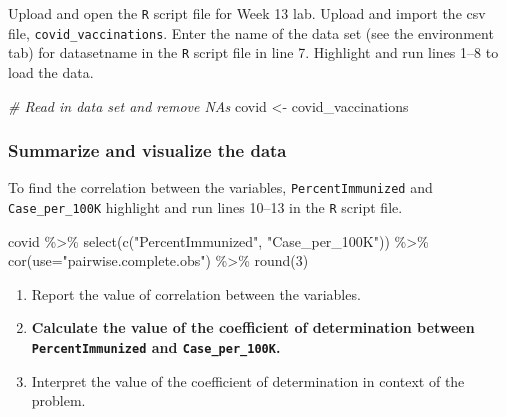 \documentclass[
]{report}
\newenvironment{Shaded}{\begin{snugshade}}{\end{snugshade}}
\newcommand{\AttributeTok}[1]{\textcolor[rgb]{0.77,0.63,0.00}{#1}}
\newcommand{\CommentTok}[1]{\textcolor[rgb]{0.56,0.35,0.01}{\textit{#1}}}
\newcommand{\DecValTok}[1]{\textcolor[rgb]{0.00,0.00,0.81}{#1}}
\newcommand{\FunctionTok}[1]{\textcolor[rgb]{0.00,0.00,0.00}{#1}}
\newcommand{\NormalTok}[1]{#1}
\newcommand{\OtherTok}[1]{\textcolor[rgb]{0.56,0.35,0.01}{#1}}
\newcommand{\SpecialCharTok}[1]{\textcolor[rgb]{0.00,0.00,0.00}{#1}}
\newcommand{\StringTok}[1]{\textcolor[rgb]{0.31,0.60,0.02}{#1}}
\begin{document}
Upload and open the \texttt{R} script file for Week 13 lab. Upload and import the csv file, \texttt{covid\_vaccinations}. Enter the name of the data set (see the environment tab) for datasetname in the \texttt{R} script file in line 7. Highlight and run lines 1--8 to load the data.

\begin{Shaded}
\begin{Highlighting}[]
\CommentTok{\# Read in data set and remove NAs}
\NormalTok{covid }\OtherTok{\textless{}{-}}\NormalTok{ covid\_vaccinations}
\end{Highlighting}
\end{Shaded}

\hypertarget{summarize-and-visualize-the-data-7}{%
\subsubsection*{Summarize and visualize the data}\label{summarize-and-visualize-the-data-7}}

To find the correlation between the variables, \texttt{PercentImmunized} and \texttt{Case\_per\_100K} highlight and run lines 10--13 in the \texttt{R} script file.

\begin{Shaded}
\begin{Highlighting}[]
\NormalTok{covid }\SpecialCharTok{\%\textgreater{}\%} 
  \FunctionTok{select}\NormalTok{(}\FunctionTok{c}\NormalTok{(}\StringTok{"PercentImmunized"}\NormalTok{, }\StringTok{"Case\_per\_100K"}\NormalTok{)) }\SpecialCharTok{\%\textgreater{}\%}
  \FunctionTok{cor}\NormalTok{(}\AttributeTok{use=}\StringTok{"pairwise.complete.obs"}\NormalTok{) }\SpecialCharTok{\%\textgreater{}\%}
  \FunctionTok{round}\NormalTok{(}\DecValTok{3}\NormalTok{)}
\end{Highlighting}
\end{Shaded}

\begin{enumerate}
\def\labelenumi{\arabic{enumi}.}
\item
  Report the value of correlation between the variables.
  \vspace{0.2in}
\item
  \textbf{Calculate the value of the coefficient of determination between \texttt{PercentImmunized} and \texttt{Case\_per\_100K}.}
  \vspace{0.4in}
\item
  Interpret the value of the coefficient of determination in context of the problem.
  \vspace{0.6in}
\end{enumerate}
\end{document}
